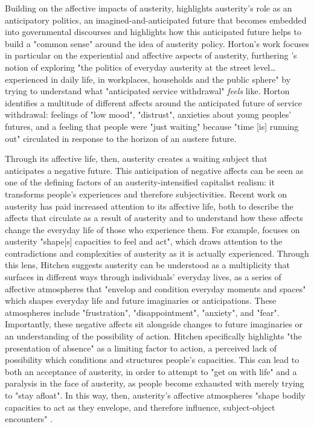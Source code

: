 Building on the affective impacts of austerity, \citet{horton_anticipating_2016} highlights austerity's role as an anticipatory politics, an imagined-and-anticipated future that becomes embedded into governmental discourses and highlights how this anticipated future helps to build a "common sense" around the idea of austerity policy. Horton's work focuses in particular on the experiential and affective aspects of austerity, furthering \citet[632]{peck_austerity_2012}'s notion of exploring "the politics of everyday austerity at the street level\ldots{} experienced in daily life, in workplaces, households and the public sphere" by trying to understand what "anticipated service withdrawal" \emph{feels} like. Horton identifies a multitude of different affects around the anticipated future of service withdrawal: feelings of "low mood", "distrust", anxieties about young peoples' futures, and a feeling that people were "just waiting" because "time [is] running out" circulated in response to the horizon of an austere future.

Through its affective life, then, austerity creates a waiting subject that anticipates a negative future. This anticipation of negative affects can be seen as one of the defining factors of an austerity-intensified capitalist realism: it transforms people's experiences and therefore subjectivities. Recent work on austerity has paid increased attention to its affective life, both to describe the affects that circulate as a result of austerity and to understand how these affects change the everyday life of those who experience them. For example, \citet[102]{hitchen_living_2016}  focuses on austerity "shape[s] capacities to feel and act", which draws attention to the contradictions and complexities of austerity as it is actually experienced. Through this lens, Hitchen suggests austerity can be understood as a multiplicity that surfaces in different ways through individuals' everyday lives, as a series of affective atmospheres that "envelop and condition everyday moments and spaces" which shapes everyday life and future imaginaries or anticipations. These atmospheres include "frustration", "disappointment", "anxiety", and "fear". Importantly, these negative affects sit alongside changes to future imaginaries or an understanding of the possibility of action. Hitchen specifically highlights "the presentation of absence" as a limiting factor to action, a perceived lack of possibility which conditions and structures people's capacities. This can lead to both an acceptance of austerity, in order to attempt to "get on with life" and a paralysis in the face of austerity, as people become exhausted with merely trying to "stay afloat". In this way, then, austerity's affective atmospheres "shape bodily capacities to act as they envelope, and therefore influence, subject-object encounters" \citep[117]{hitchen_living_2016}.

